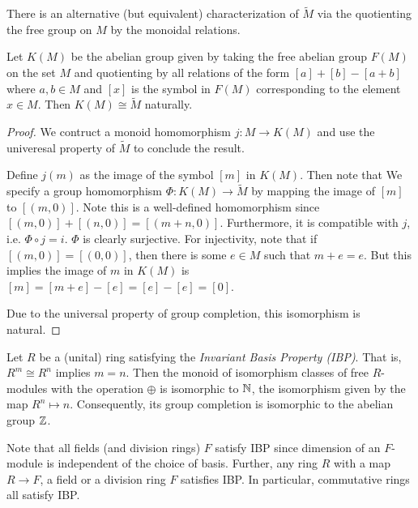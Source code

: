 There is an alternative (but equivalent) characterization of $\widetilde{M}$ via the quotienting the free group on $M$ by the monoidal relations.
\begin{proposition}
  Let $K(M)$ be the abelian group given by taking the free abelian group $F(M)$ on the set $M$ and quotienting
  by all relations of the form $[a] + [b] - [a+b]$ where $a, b \in M$ and $[x]$ is the symbol in $F(M)$ corresponding to the element $x \in M$.
  Then $K(M) \cong \widetilde{M}$ naturally.
\end{proposition}
\begin{proof}
  We contruct a monoid homomorphism $j : M \to K(M)$ and use the univeresal property of $\widetilde{M}$ to conclude the result.

  Define $j(m)$ as the image of the symbol $[m]$ in $K(M)$.
  Then note that 
  We specify a group homomorphism $\Phi : K(M) \to \widetilde M$ by mapping the image of $[m]$
  to $[(m,0)]$. Note this is a well-defined homomorphism since $[(m,0)] + [(n,0)] = [(m+n,0)]$.
  Furthermore, it is compatible with $j$, i.e. $\Phi \circ j = i$.
  $\Phi$ is clearly surjective. 
  For injectivity, note that if $[(m,0)] = [(0,0)]$, then there is some $e \in M$ such that 
  $m + e = e$. But this implies the image of $m$ in $K(M)$ is $[m] = [m+e] - [e] = [e] - [e] = [0]$.

  Due to the universal property of group completion, this isomorphism is natural.

\end{proof}

\begin{example}
  Let $R$ be a (unital) ring satisfying the \textit{Invariant Basis Property (IBP)}. That is, $R^m \cong R^n$ implies $m = n$.
  Then the monoid of isomorphism classes of free $R$-modules with the operation $\oplus$ is isomorphic to $\mathbb{N}$, the isomorphism given by the map $R^n \mapsto n$. Consequently, its group completion
  is isomorphic to the abelian group $\mathbb{Z}$. 
\end{example}
Note that all fields (and division rings) $F$ satisfy IBP since dimension of an $F$-module is independent of the choice of basis.
Further, any ring $R$ with a map $R \to F$, a field or a division ring $F$ satisfies IBP. In particular, commutative rings all satisfy IBP.

